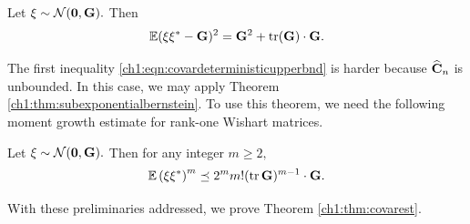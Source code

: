 \begin{lemma}
\label{ch1:lemma:gaussiancentralsecondmoment}
Let $\mathbf{\xi} \sim \mathcal{N}(\mathbf{0}, \mathbf{G}).$ Then
$$
\mathbb{E}(\mathbf{\xi}\mathbf{\xi}^* - \mathbf{G})^2 = \mathbf{G}^2 + \operatorname{tr}(\mathbf{G})\cdot
\mathbf{G}. 
$$
\end{lemma}

The first inequality \eqref{ch1:eqn:covardeterministicupperbnd} is harder because
$\widehat{\mathbf{C}}_n$ is unbounded. In this case, we may apply Theorem
\ref{ch1:thm:subexponentialbernstein}. To use this theorem, we need the following
moment growth estimate for rank-one Wishart matrices.

\begin{lemma}
\label{ch1:lemma:momentbound}
Let $\mathbf{\xi} \sim \mathcal{N}(\mathbf{0},\mathbf{G}).$ Then for any integer $m \geq
2,$
$$
\mathbb{E}\left(\mathbf{\xi}\mathbf{\xi}^* \right)^m \preceq 2^m m! (\operatorname{tr}
\mathbf{G})^{m-1}\cdot \mathbf{G}.
$$
\end{lemma}

With these preliminaries addressed, we prove Theorem \ref{ch1:thm:covarest}.

